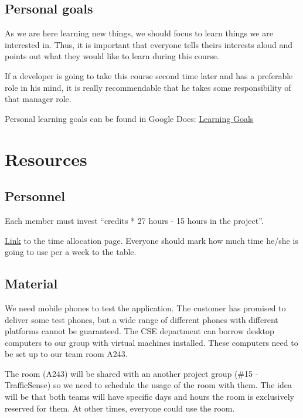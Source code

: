 \subsection{Personal goals}

As we are here learning new things, we should focus to learn things we are interested in. Thus, it is important that everyone tells theirs interests aloud and points out what they would like to learn during this course. 

If a developer is going to take this course second time later and has a preferable role in his mind, it is really recommendable that he takes some responsibility of that manager role.

Personal learning goals can be found in Google Docs: 
\href{https://docs.google.com/spreadsheet/ccc?key=0Ahu59q_GwtcedHJZdjQ1RWROZFYxa
0RTcWp3MkJkTnc&usp=sharing}{Learning Goals}

\section{Resources}
\subsection{Personnel}

Each member must invest ``credits * 27 hours - 15 hours in the project''.

\href{https://docs.google.com/spreadsheet/ccc?key=0Ahu59q_GwtcedHI3MnJQM0NWZS11a
GxFTzFZeVEyQVE&usp=sharing}{Link} to the time allocation page. Everyone should 
mark how much time he/she is going to use per a week to the table.

\subsection{Material}

We need mobile phones to test the application. The customer has promised to 
deliver some test phones, but a wide range of different phones with different 
platforms cannot be guaranteed. The CSE department can borrow desktop computers 
to our group with virtual machines installed. These computers need to be set up 
to our team room A243.

The room (A243) will be shared with an another project group (\#15 - 
TrafficSense) so we need to schedule the usage of the room with them. The idea 
will be that both teams will have specific days and hours the room is 
exclusively reserved for them. At other times, everyone could use the room.

